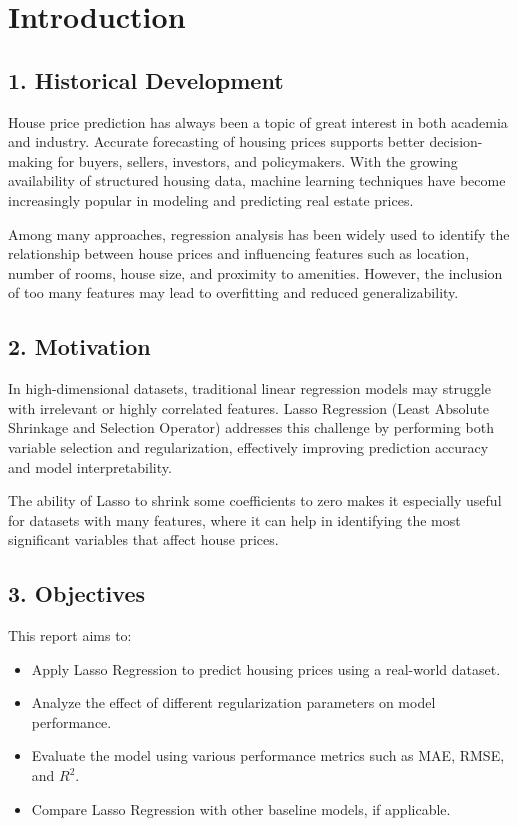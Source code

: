 \documentclass[12pt, a4paper]{report}
\begin{document}
\vspace{1cm}

\tableofcontents
\newpage



\chapter*{Introduction}

\section*{1. Historical Development}
House price prediction has always been a topic of great interest in both academia and industry. Accurate forecasting of housing prices supports better decision-making for buyers, sellers, investors, and policymakers. With the growing availability of structured housing data, machine learning techniques have become increasingly popular in modeling and predicting real estate prices.

Among many approaches, regression analysis has been widely used to identify the relationship between house prices and influencing features such as location, number of rooms, house size, and proximity to amenities. However, the inclusion of too many features may lead to overfitting and reduced generalizability.

\section*{2. Motivation}
In high-dimensional datasets, traditional linear regression models may struggle with irrelevant or highly correlated features. Lasso Regression (Least Absolute Shrinkage and Selection Operator) addresses this challenge by performing both variable selection and regularization, effectively improving prediction accuracy and model interpretability.

The ability of Lasso to shrink some coefficients to zero makes it especially useful for datasets with many features, where it can help in identifying the most significant variables that affect house prices.

\section*{3. Objectives}
This report aims to:
\begin{itemize}
    \item Apply Lasso Regression to predict housing prices using a real-world dataset.
    \item Analyze the effect of different regularization parameters on model performance.
    \item Evaluate the model using various performance metrics such as MAE, RMSE, and $R^2$.
    \item Compare Lasso Regression with other baseline models, if applicable.
\end{itemize}
\end{document}
